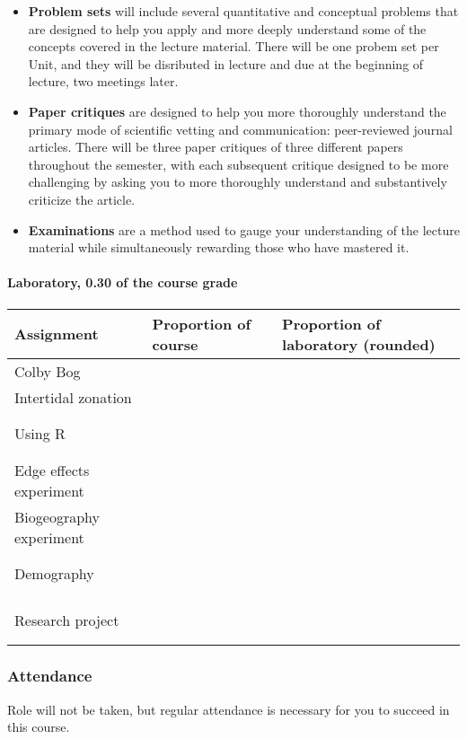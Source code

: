 \documentclass[]{article}
\providecommand{\tightlist}{%
  \setlength{\itemsep}{0pt}\setlength{\parskip}{0pt}}
\let\oldparagraph\paragraph
\renewcommand{\paragraph}[1]{\oldparagraph{#1}\mbox{}}
\begin{document}
\begin{itemize}
\tightlist
\item
  \textbf{Problem sets} will include several quantitative and conceptual
  problems that are designed to help you apply and more deeply
  understand some of the concepts covered in the lecture material. There
  will be one probem set per Unit, and they will be disributed in
  lecture and due at the beginning of lecture, two meetings later.
\item
  \textbf{Paper critiques} are designed to help you more thoroughly
  understand the primary mode of scientific vetting and communication:
  peer-reviewed journal articles. There will be three paper critiques of
  three different papers throughout the semester, with each subsequent
  critique designed to be more challenging by asking you to more
  thoroughly understand and substantively criticize the article.
\item
  \textbf{Examinations} are a method used to gauge your understanding of
  the lecture material while simultaneously rewarding those who have
  mastered it.
\end{itemize}

\paragraph{Laboratory, 0.30 of the course
grade}\label{laboratory-0.30-of-the-course-grade}

\begin{longtable}[]{@{}lll@{}}
\toprule
Assignment & Proportion of course & Proportion of laboratory
(rounded)\tabularnewline
\midrule
\endhead
Colby Bog & &\tabularnewline
Intertidal zonation & &\tabularnewline
Using R ~ ~ ~ ~ & ~ ~ ~ ~ ~ ~ ~ ~ ~ ~ & ~ ~ ~ ~ ~ ~ ~ ~ ~ ~ ~ ~ ~ ~ ~ ~
~\tabularnewline
Edge effects experiment & ~ ~ ~ ~ ~ ~ ~ ~ & ~ ~ ~ ~ ~ ~ ~ ~ ~ ~ ~ ~ ~ ~
~\tabularnewline
Biogeography experiment & ~ ~ ~ ~ ~ ~ ~ ~ & ~ ~ ~ ~ ~ ~ ~ ~ ~ ~ ~ ~ ~ ~
~\tabularnewline
Demography & ~ ~ ~ ~ ~ ~ ~ ~ & ~ ~ ~ ~ ~ ~ ~ ~ ~ ~ ~ ~ ~ ~
~\tabularnewline
Research project & ~ ~ ~ ~ ~ ~ ~ ~ & ~ ~ ~ ~ ~ ~ ~ ~ ~ ~ ~ ~ ~ ~
~\tabularnewline
\bottomrule
\end{longtable}

\subsubsection{Attendance }\label{attendance}

Role will not be taken, but regular attendance is necessary for you to
succeed in this course.
\end{document}
